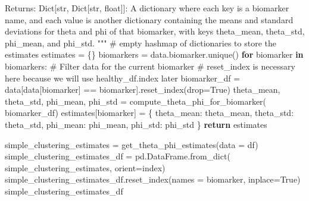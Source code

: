 \documentclass[
  letterpaper,
  DIV=11,
  numbers=noendperiod]{scrreprt}
\newenvironment{Shaded}{\begin{snugshade}}{\end{snugshade}}
\newcommand{\CommentTok}[1]{\textcolor[rgb]{0.37,0.37,0.37}{#1}}
\newcommand{\ControlFlowTok}[1]{\textcolor[rgb]{0.00,0.23,0.31}{\textbf{#1}}}
\newcommand{\KeywordTok}[1]{\textcolor[rgb]{0.00,0.23,0.31}{\textbf{#1}}}
\newcommand{\NormalTok}[1]{\textcolor[rgb]{0.00,0.23,0.31}{#1}}
\newcommand{\OperatorTok}[1]{\textcolor[rgb]{0.37,0.37,0.37}{#1}}
\newcommand{\StringTok}[1]{\textcolor[rgb]{0.13,0.47,0.30}{#1}}
\newcommand{\VariableTok}[1]{\textcolor[rgb]{0.07,0.07,0.07}{#1}}
\begin{document}
\begin{Shaded}
\begin{Highlighting}[]
\CommentTok{    Returns:}
\CommentTok{    Dict[str, Dict[str, float]]: A dictionary where each key is a biomarker name,}
\CommentTok{        and each value is another dictionary containing the means and standard deviations }
\CommentTok{        for theta and phi of that biomarker, with keys \textquotesingle{}theta\_mean\textquotesingle{}, \textquotesingle{}theta\_std\textquotesingle{}, \textquotesingle{}phi\_mean\textquotesingle{}, }
\CommentTok{        and \textquotesingle{}phi\_std\textquotesingle{}.}
\CommentTok{    """}
    \CommentTok{\# empty hashmap of dictionaries to store the estimates}
\NormalTok{    estimates }\OperatorTok{=}\NormalTok{ \{\}}
\NormalTok{    biomarkers }\OperatorTok{=}\NormalTok{ data.biomarker.unique()}
    \ControlFlowTok{for}\NormalTok{ biomarker }\KeywordTok{in}\NormalTok{ biomarkers:}
        \CommentTok{\# Filter data for the current biomarker}
        \CommentTok{\# reset\_index is necessary here because we will use healthy\_df.index later}
\NormalTok{        biomarker\_df }\OperatorTok{=}\NormalTok{ data[data[}\StringTok{\textquotesingle{}biomarker\textquotesingle{}}\NormalTok{]}
                            \OperatorTok{==}\NormalTok{ biomarker].reset\_index(drop}\OperatorTok{=}\VariableTok{True}\NormalTok{)}
\NormalTok{        theta\_mean, theta\_std, phi\_mean, phi\_std }\OperatorTok{=}\NormalTok{ compute\_theta\_phi\_for\_biomarker(}
\NormalTok{            biomarker\_df)}
\NormalTok{        estimates[biomarker] }\OperatorTok{=}\NormalTok{ \{}
            \StringTok{\textquotesingle{}theta\_mean\textquotesingle{}}\NormalTok{: theta\_mean,}
            \StringTok{\textquotesingle{}theta\_std\textquotesingle{}}\NormalTok{: theta\_std,}
            \StringTok{\textquotesingle{}phi\_mean\textquotesingle{}}\NormalTok{: phi\_mean,}
            \StringTok{\textquotesingle{}phi\_std\textquotesingle{}}\NormalTok{: phi\_std}
\NormalTok{        \}}
    \ControlFlowTok{return}\NormalTok{ estimates}
\end{Highlighting}
\end{Shaded}

\begin{Shaded}
\begin{Highlighting}[]
\NormalTok{simple\_clustering\_estimates }\OperatorTok{=}\NormalTok{ get\_theta\_phi\_estimates(data }\OperatorTok{=}\NormalTok{ df)}
\NormalTok{simple\_clustering\_estimates\_df }\OperatorTok{=}\NormalTok{ pd.DataFrame.from\_dict(}
\NormalTok{    simple\_clustering\_estimates, orient}\OperatorTok{=}\StringTok{\textquotesingle{}index\textquotesingle{}}\NormalTok{)}
\NormalTok{simple\_clustering\_estimates\_df.reset\_index(names }\OperatorTok{=} \StringTok{\textquotesingle{}biomarker\textquotesingle{}}\NormalTok{, inplace}\OperatorTok{=}\VariableTok{True}\NormalTok{)}
\NormalTok{simple\_clustering\_estimates\_df}
\end{Highlighting}
\end{Shaded}
\end{document}
